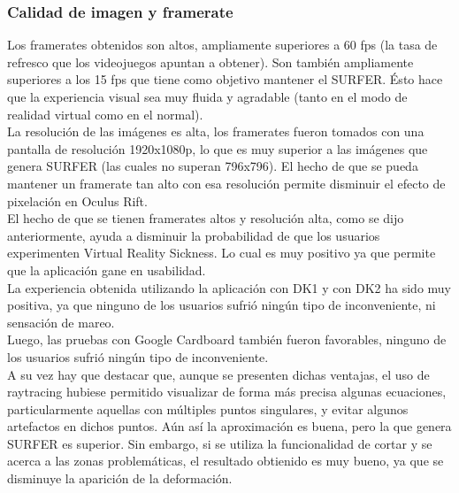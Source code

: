 \documentclass[12pt]{article}
\begin{document}
\subsubsection{Calidad de imagen y framerate}
Los framerates obtenidos son altos, ampliamente superiores a 60 fps (la tasa de refresco que los videojuegos apuntan a obtener). Son también ampliamente superiores a los 15 fps que tiene como objetivo mantener el SURFER. Ésto hace que la experiencia visual sea muy fluida y agradable (tanto en el modo de realidad virtual como en el normal). 
\\La resolución de las imágenes es alta, los framerates fueron tomados con una pantalla de resolución 1920x1080p, lo que es muy superior a las imágenes que genera SURFER (las cuales no superan 796x796). El hecho de que se pueda mantener un framerate tan alto con esa resolución permite disminuir el efecto de pixelación en Oculus Rift. 
\\El hecho de que se tienen framerates altos y resolución alta, como se dijo anteriormente, ayuda a disminuir la probabilidad de que los usuarios experimenten Virtual Reality Sickness. Lo cual es muy positivo ya que permite que la aplicación gane en usabilidad.
\\La experiencia obtenida utilizando la aplicación con DK1 y con DK2 ha sido muy positiva, ya que ninguno de los usuarios sufrió ningún tipo de inconveniente, ni sensación de mareo. 
\\Luego, las pruebas con Google Cardboard también fueron favorables, ninguno de los usuarios sufrió ningún tipo de inconveniente.
\\A su vez hay que destacar que, aunque se presenten dichas ventajas, el uso de raytracing hubiese permitido visualizar de forma más precisa algunas ecuaciones, particularmente aquellas con múltiples puntos singulares, y evitar algunos artefactos en dichos puntos. Aún así la aproximación es buena, pero la que genera SURFER es superior. Sin embargo, si se utiliza la funcionalidad de cortar y se acerca a las zonas problemáticas, el resultado obtienido es muy bueno, ya que se disminuye la aparición de la deformación.
\end{document}
